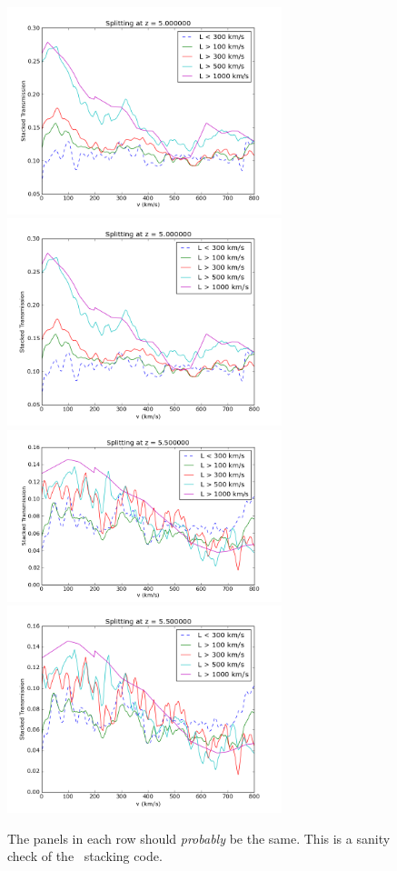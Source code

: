 \documentclass[11pt]{article}
\begin{document}
\begin{figure}[h]
  \centering
  \includegraphics[width=8cm]{Stack_Zgreaterthan5.png}
  \includegraphics[width=8cm]{LybSanity_zGreaterThan5.png}
  \includegraphics[width=8cm]{Stack_Zgreaterthan5p5.png}
  \includegraphics[width=8cm]{LybSanity_zGreaterThan5p5.png}
  \caption{The panels in each row should \textit{probably} be the same. This is a sanity check of the \lyb\ stacking code.}
  \label{fig:todo}
\end{figure}
\end{document}
